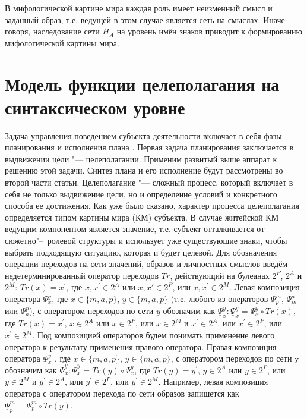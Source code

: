 \begin{appendices}
В мифологической картине мира каждая роль имеет неизменный смысл и заданный образ, т.е. ведущей в этом случае является сеть на смыслах. Иначе говоря, наследование сети $H_A$ на уровень имён знаков приводит к формированию мифологической картины мира.

\chapter{Модель функции целеполагания на синтаксическом уровне} \label{AppendixB}

Задача управления поведением субъекта деятельности включает в себя фазы планирования и исполнения плана \cite{Osipov2002c,Osipov2003a,Osipov2008b}. Первая задача планирования заключается в выдвижении цели "--- целеполагании. Применим развитый выше аппарат к решению этой задачи. Синтез плана и его исполнение будут рассмотрены во второй части статьи.
Целеполагание "--- сложный процесс, который включает в себя не только выдвижение цели, но и определение условий и конкретного способа ее достижения. Как уже было сказано, характер процесса целеполагания определяется типом картины мира (КМ) субъекта. В случае житейской КМ ведущим компонентом является значение, т.е. субъект отталкивается от сюжетно"--~ролевой структуры и использует уже существующие знаки, чтобы выбрать подходящую ситуацию, которая и будет целевой.
Для обозначения операции переходов на сети значений, образов и личностных смыслов введём недетерминированный оператор переходов $Tr$, действующий на булеанах $2^P$, $2^A$ и $2^M$: $Tr(x)=x^\prime$, где $x,x^\prime\in 2^A$ или $x,x\prime\in 2^P$, или $x,x^\prime\in 2^M$. Левая композиция оператора $\Psi_x^y$, где $x\in\{m, a, p\}$, $y\in\{m, a, p\}$ (т.е. любого из операторов  $\Psi_p^m$, $\Psi_m^a$ или $\Psi_a^p$), с оператором переходов по сети $y$ обозначим как $\underline{\Psi}_x^y:\underline{\Psi}_x^y=\Psi_x^y\circ Tr(x)$, где $Tr(x)=x^\prime$, $x\in 2^A$ или $x\in 2^P$, или $x\in 2^M$ и $x^\prime\in 2^A$, или $x^\prime\in 2^P$, или $x^\prime\in 2^M$. Под композицией операторов будем понимать применение левого оператора к результату применения правого оператора. Правая композиция оператора $\Psi_x^y$ , где $x\in\{m, a, p\}$, $y\in\{m, a, p\}$, с оператором переходов по сети y обозначим как $\overline{\Psi}_x^y: \overline{\Psi}_x^y=Tr(y)\circ\Psi_x^y$, где $Tr(y)=y^\prime$, $y\in 2^A$ или $y\in 2^P$, или $y\in 2^M$ и  $y^\prime\in 2^A$, или $y^\prime\in 2^P$, или $y^\prime\in 2^M$. Например, левая композиция оператора   с оператором перехода по сети образов запишется как $\underline{\Psi}_p^m=\Psi_p^m\circ Tr(y)$.


\end{appendices}
